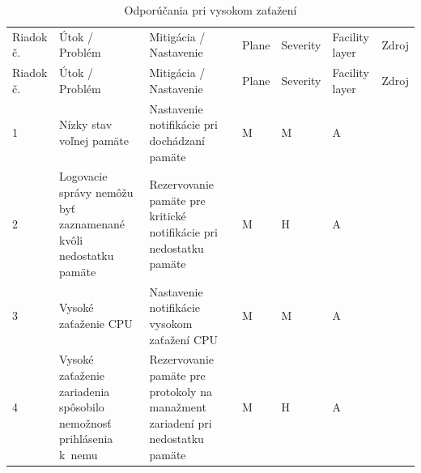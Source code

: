 \begin{longtable}[!htbp]{|C{2.5em}L{11em}L{11em}C{2.5em}C{4em}C{5em}L{2.5em}|}
	\caption{Odporúčania pri vysokom zaťažení}
	\label{tab:highload}\\ \hline
	\mbox{Riadok} č.&Útok / Problém	&Mitigácia / Nastavenie	&Plane	&Severity	&Facility layer	&Zdroj\\ \hhline{=======}
	\endfirsthead 
	\hline
	\centering
	
	Riadok č.	&Útok / Problém	&Mitigácia / Nastavenie	&Plane	&Severity	&Facility layer	&Zdroj\\ \hhline{=======}
	\endhead
	
	 1	&Nízky stav voľnej pamäte	&Nastavenie notifikácie pri dochádzaní pamäte	&M	&M	&A	& \cite{Singh2018}
	
	\cite{uYLsMtQInofenpV3}\\
	2	&Logovacie správy nemôžu byť zaznamenané kvôli nedostatku pamäte	&Rezervovanie pamäte pre kritické notifikácie pri nedostatku pamäte	&M	&H	&A	& \cite{Singh2018}
	
	\cite{uYLsMtQInofenpV3}\\
	 3	&Vysoké zaťaženie CPU	&Nastavenie notifikácie vysokom zaťažení CPU	&M	&M	&A	& \cite{Singh2018}
	
	\cite{uYLsMtQInofenpV3}\\
	4	&Vysoké zaťaženie zariadenia spôsobilo nemožnosť prihlásenia k~nemu	&Rezervovanie pamäte pre protokoly na manažment zariadení pri nedostatku pamäte	&M	&H	&A	& \cite{Singh2018}\\	
	\hline
\end{longtable}%

